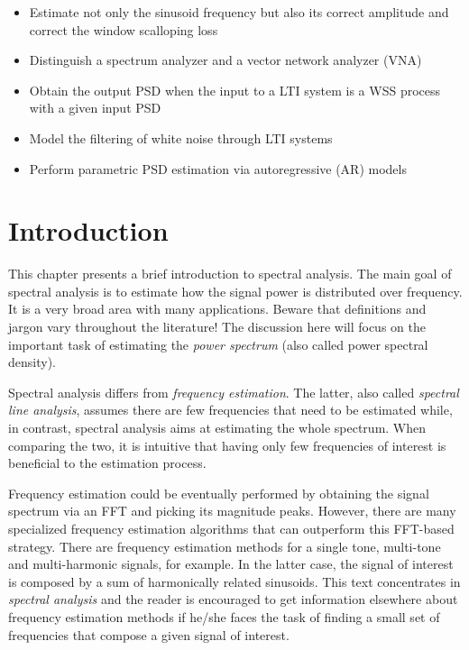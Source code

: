 \begin{itemize}
	\item Estimate not only the sinusoid frequency but also its correct amplitude and correct the window scalloping loss
	\item Distinguish a spectrum analyzer and a vector network analyzer (VNA)
	\item Obtain the output PSD when the input to a LTI system is a WSS process with a given input PSD
	\item Model the filtering of white noise through LTI systems
	\item Perform parametric PSD estimation via autoregressive (AR) models
\end{itemize}

\section{Introduction}

This chapter presents a brief introduction to spectral analysis.
The main goal of spectral analysis is to estimate how the signal power is distributed over frequency. It is a very broad area with many applications. Beware that definitions and jargon vary throughout the literature! The discussion here will focus on the important task of estimating the \emph{power spectrum} (also called power spectral density).

Spectral analysis differs from \emph{frequency estimation}. The latter, also called \emph{spectral line analysis}, assumes there are few frequencies that need to be estimated while, in contrast, spectral analysis aims at estimating the whole spectrum. When comparing the two, it is intuitive that having only few frequencies of interest is beneficial to the estimation process.


Frequency estimation could be eventually performed by obtaining the signal spectrum via an FFT and picking its magnitude peaks.
However, there are many specialized frequency estimation algorithms that can outperform this FFT-based strategy.
There are frequency estimation methods for a single tone, multi-tone and multi-harmonic signals, for example. In the latter case, the signal of interest is composed by a sum of harmonically related sinusoids. This text concentrates in \emph{spectral analysis} and the reader is encouraged to get information elsewhere about frequency estimation methods if he/she faces the task of finding a small set of frequencies that compose a given signal of interest.

